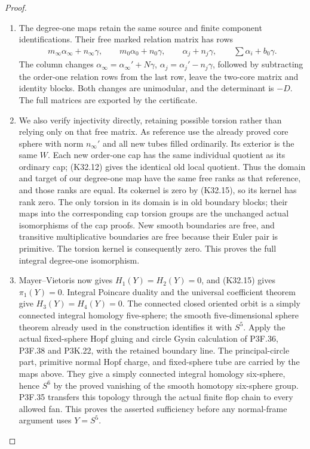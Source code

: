 \begin{proof}
\begin{enumerate}[label=\arabic*.]
\item The degree-one maps retain the same source and finite
component identifications. Their free marked relation
matrix has rows
\[
 \begin{gathered}
 m_\infty\alpha_\infty+n_\infty\gamma,\qquad
 m_0\alpha_0+n_0\gamma,\qquad
 \alpha_j+n_j\gamma,\qquad
 \sum\alpha_i+b_0\gamma.
 \end{gathered}                                      \tag{K32.16}
\]
The column changes
$\alpha_\infty=\alpha_\infty'+N\gamma$,
$\alpha_j=\alpha_j'-n_j\gamma$, followed by subtracting
the order-one relation rows from the last row, leave
the two-core matrix and identity blocks. Both changes
are unimodular, and the determinant is $-D$.
The full matrices are exported by the certificate.

\item We also verify injectivity directly, retaining possible
torsion rather than relying only on that free matrix.
As reference use the already proved core sphere with
norm $n_\infty'$ and all new tubes filled ordinarily.
Its exterior is the same $W$. Each new order-one cap
has the same individual quotient as its ordinary cap;
(K32.12) gives the identical old local quotient.
Thus the domain and target of our degree-one map have
the same free ranks as that reference, and those ranks
are equal. Its cokernel is zero by (K32.15), so its
kernel has rank zero. The only torsion in its domain
is in old boundary blocks; their maps into the
corresponding cap torsion groups are the unchanged
actual isomorphisms of the cap proofs. New smooth
boundaries are free, and transitive multiplicative
boundaries are free because their Euler pair is
primitive. The torsion kernel is consequently zero.
This proves the full integral degree-one isomorphism.

\item Mayer--Vietoris now gives $H_1(Y)=H_2(Y)=0$, and
(K32.15) gives $\pi_1(Y)=0$. Integral Poincare duality
and the universal coefficient theorem give
$H_3(Y)=H_4(Y)=0$. The connected closed oriented orbit
is a simply connected integral homology five-sphere;
the smooth five-dimensional sphere theorem already
used in the construction identifies it with $S^5$.
Apply the actual fixed-sphere Hopf gluing and circle
Gysin calculation of P3F.36, P3F.38 and P3K.22, with
the retained boundary line. The principal-circle part,
primitive normal Hopf charge, and fixed-sphere tube
are carried by the maps above. They give a simply
connected integral homology six-sphere, hence $S^6$
by the proved vanishing of the smooth homotopy
six-sphere group. P3F.35 transfers this topology
through the actual finite flop chain to every
allowed fan. This proves the asserted sufficiency
before any normal-frame argument uses $Y=S^5$.


\end{enumerate}
\end{proof}
